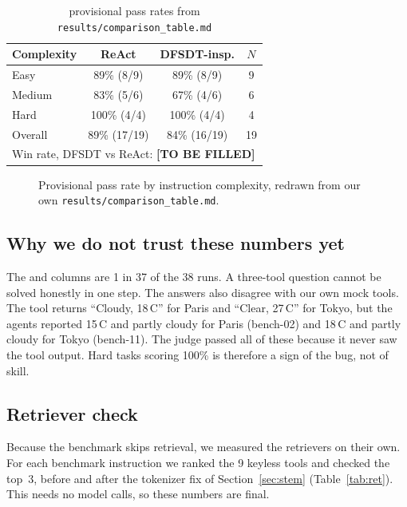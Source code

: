 \documentclass[conference,a4paper]{IEEEtran}
\newcommand{\tbf}{\textbf{[TO BE FILLED]}}
\newcommand{\prov}{provisional}
\begin{document}
\begin{table}[t]
  \centering
  \caption{\prov{} pass rates from \texttt{results/comparison\_table.md}}
  \label{tab:pass}
  \small
  \setlength{\tabcolsep}{4pt}
  \begin{tabular}{lccc}
    \toprule
    Complexity & ReAct & DFSDT-insp. & $N$ \\
    \midrule
    Easy    & 89\% (8/9)   & 89\% (8/9)   & 9 \\
    Medium  & 83\% (5/6)   & 67\% (4/6)   & 6 \\
    Hard    & 100\% (4/4)  & 100\% (4/4)  & 4 \\
    \midrule
    Overall & 89\% (17/19) & 84\% (16/19) & 19 \\
    \midrule
    \multicolumn{4}{l}{Win rate, DFSDT vs ReAct: \tbf{}} \\
    \bottomrule
  \end{tabular}
\end{table}

\begin{figure}[t]
  \centering
  
  \caption{Provisional pass rate by instruction complexity, redrawn from our
  own \texttt{results/comparison\_table.md}.}
  \label{fig:pass}
\end{figure}

\subsection{Why we do not trust these numbers yet}\label{sec:distrust}
The  and  columns are 1 in 37 of the
38 runs. A three-tool question cannot be solved honestly in one step. The
answers also disagree with our own mock tools. The  tool
returns ``Cloudy, 18\,\textdegree C'' for Paris and ``Clear,
27\,\textdegree C'' for Tokyo, but the agents reported 15\,\textdegree C
and partly cloudy for Paris (bench-02) and 18\,\textdegree C and partly
cloudy for Tokyo (bench-11). The judge passed all of these because it
never saw the tool output. Hard tasks scoring 100\% is therefore a sign of
the bug, not of skill.

\subsection{Retriever check}
Because the benchmark skips retrieval, we measured the retrievers on their
own. For each benchmark instruction we ranked the 9 keyless tools and
checked the top~3, before and after the tokenizer fix of
Section~\ref{sec:stem} (Table~\ref{tab:ret}). This needs no model calls,
so these numbers are final.
\end{document}
